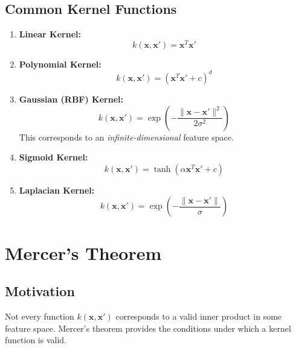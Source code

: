 \documentclass{tufte-handout}
\begin{document}
\subsection{Common Kernel Functions}

\begin{enumerate}
    \item \textbf{Linear Kernel:}
    \begin{equation}
    k(\mathbf{x}, \mathbf{x}') = \mathbf{x}^T\mathbf{x}'
    \end{equation}
    
    \item \textbf{Polynomial Kernel:}
    \begin{equation}
    k(\mathbf{x}, \mathbf{x}') = (\mathbf{x}^T\mathbf{x}' + c)^d
    \end{equation}
    
    \item \textbf{Gaussian (RBF) Kernel:}
    \begin{equation}
    k(\mathbf{x}, \mathbf{x}') = \exp\left(-\frac{\|\mathbf{x} - \mathbf{x}'\|^2}{2\sigma^2}\right)
    \end{equation}
    This corresponds to an \emph{infinite-dimensional} feature space.
    
    \item \textbf{Sigmoid Kernel:}
    \begin{equation}
    k(\mathbf{x}, \mathbf{x}') = \tanh(\alpha \mathbf{x}^T\mathbf{x}' + c)
    \end{equation}
    
    \item \textbf{Laplacian Kernel:}
    \begin{equation}
    k(\mathbf{x}, \mathbf{x}') = \exp\left(-\frac{\|\mathbf{x} - \mathbf{x}'\|}{\sigma}\right)
    \end{equation}
\end{enumerate}

\section{Mercer's Theorem}

\subsection{Motivation}

Not every function $k(\mathbf{x}, \mathbf{x}')$ corresponds to a valid inner product in some feature space. Mercer's theorem provides the conditions under which a kernel function is valid.
\end{document}

